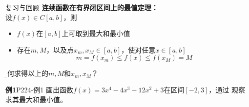 \begin{frame}{复习与回顾}
	\linespread{1.2}\pause 
	{\bf 连续函数在有界闭区间上的最值定理：}\\[1ex]
	\pause 
	设$f(x)\in C[a,b]$，则\pause 
	\begin{itemize}
	  \item $f(x)$在$[a,b]$上可取到最大和最小值\pause 
	  \item 存在$m,M$，\pause 以及点$x_m,x_M\in[a,b]$，\pause 使对任意$x\in[a,b]$\pause 
	  $$m=f(x_m)\leq f(x)\leq f(x_M)=M$$
	\end{itemize}
	\pause 
	{}{\b 如何求得以上的$m,M$和$x_m,x_M$？}
\end{frame}

\begin{frame}
	\linespread{1.2}
	\begin{exampleblock}{{\bf 例1}\hfill P224-例1 }
		画出函数$f(x)=3x^4-4x^3-12x^2+3$在区间$[-2,3]$，通过
		观察求其最大和最小值。
	\end{exampleblock}
	\begin{columns}
		\begin{center}

\end{center}
\end{columns}
\end{frame}
